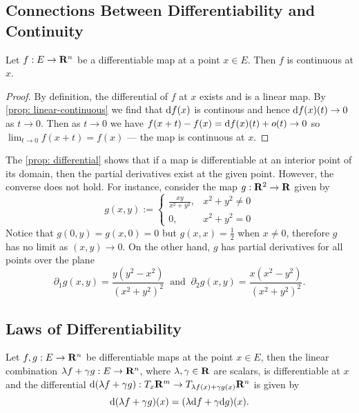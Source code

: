 \subsection{Connections Between Differentiability and Continuity}

\begin{corollary}
  Let \(f: E \to \mathbf{R}^n\) be a differentiable map at a point \(x \in E\).
  Then \(f\) is continuous at \(x\).
\end{corollary}

\begin{proof}
  By definition, the differential of \(f\) at \(x\) exists and is a linear map.
  By \cref{prop: linear-continuous} we find that \(\mathrm{d} f(x)\) is continous and
  hence \(\mathrm{d} f(x)(t) \to 0\) as \(t \to 0\). Then as \(t \to 0\) we have
  \(f(x + t) - f(x) = \mathrm{d} f(x)(t) + o(t) \to 0\) so \(\lim_{t \to 0} f(x + t)
  = f(x)\) --- the map is continuous at \(x\).
\end{proof}

\begin{remark}
  The \cref{prop: differential} shows that if a map is differentiable at an
  interior point of its domain, then the partial derivatives exist at the given
  point. However, the converse does not hold. For instance, consider the map
  \(g: \mathbf{R}^2 \to \mathbf{R}\) given by
  \[
    g(x, y) :=
    \begin{cases}
      \frac{x y}{x^2 + y^2}, &x^2 + y^2 \neq 0 \\
      0, &x^2 + y^2 = 0
    \end{cases}
  \]
  Notice that \(g(0, y) = g(x, 0) = 0\) but \(g(x, x) = \frac 1 2\) when \(x
  \neq 0\), therefore \(g\) has no limit as \((x,y) \to 0\). On the other hand,
  \(g\) has partial derivatives for all points over the plane
  \[
    \partial_1 g(x, y) = \frac{y (y^2 - x^2)}{(x^2 + y^2)^2}
    \ \text{ and }\
    \partial_2 g(x, y) = \frac{x (x^2 - y^2)}{(x^2 + y^2)^2}.
  \]
\end{remark}

\subsection{Laws of Differentiability}

\begin{theorem}\label{thm: diff-linear}
  Let \(f, g: E \to \mathbf{R}^n\) be differentiable maps at the point \(x \in E\), then
  the linear combination \(\lambda f + \gamma g: E \to \mathbf{R}^n\), where \(\lambda,
  \gamma \in \mathbf{R}\) are scalars, is differentiable at \(x\) and the differential
  \(\mathrm{d}(\lambda f + \gamma g): T_x\mathbf{R}^m \to T_{\lambda f(x) + \gamma
  g(x)}\mathbf{R}^n\) is given by
  \[
    \mathrm{d} (\lambda f + \gamma g)(x) = (\lambda \mathrm{d} f + \gamma \mathrm{d} g)(x).
  \]
\end{theorem}

